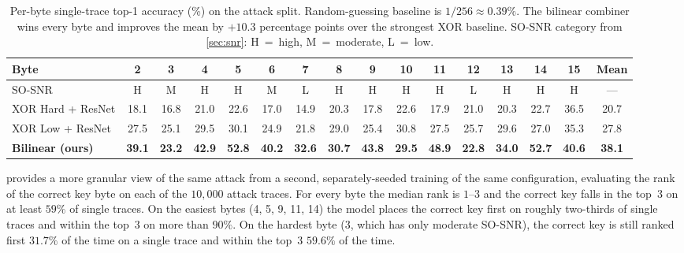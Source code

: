 \documentclass[runningheads]{llncs}
\begin{document}
\begin{table}[t]
  \centering
  \caption{Per-byte single-trace top-1 accuracy (\%) on the attack split.
  Random-guessing baseline is $1/256 \approx 0.39\%$.
  The bilinear combiner wins every byte and improves the mean by $+10.3$ percentage points over the strongest XOR baseline.
  SO-SNR category from \cref{sec:snr}: H~=~high, M~=~moderate, L~=~low.}
  \label{tab:perbyte}
  \scriptsize
  \setlength{\tabcolsep}{3pt}
  \begin{tabular}{@{}l*{14}{c}c@{}}
    \toprule
    \textbf{Byte} & 2 & 3 & 4 & 5 & 6 & 7 & 8 & 9 & 10 & 11 & 12 & 13 & 14 & 15 & \textbf{Mean} \\
    \midrule
    SO-SNR                & H & M & H & H & M & L & H & H & H & H & L & H & H & H & --- \\
    \midrule
    XOR Hard + ResNet     & 18.1 & 16.8 & 21.0 & 22.6 & 17.0 & 14.9 & 20.3 & 17.8 & 22.6 & 17.9 & 21.0 & 20.3 & 22.7 & 36.5 & 20.7 \\
    XOR Low + ResNet      & 27.5 & 25.1 & 29.5 & 30.1 & 24.9 & 21.8 & 29.0 & 25.4 & 30.8 & 27.5 & 25.7 & 29.6 & 27.0 & 35.3 & 27.8 \\
    \textbf{Bilinear (ours)} & \textbf{39.1} & \textbf{23.2} & \textbf{42.9} & \textbf{52.8} & \textbf{40.2} & \textbf{32.6} & \textbf{30.7} & \textbf{43.8} & \textbf{29.5} & \textbf{48.9} & \textbf{22.8} & \textbf{34.0} & \textbf{52.7} & \textbf{40.6} & \textbf{38.1} \\
    \bottomrule
  \end{tabular}
\end{table}

 provides a more granular view of the same attack from a second, separately-seeded training of the same configuration, evaluating the rank of the correct key byte on each of the $10{,}000$ attack traces.
For every byte the median rank is $1$--$3$ and the correct key falls in the top~$3$ on at least $59\%$ of single traces.
On the easiest bytes (4, 5, 9, 11, 14) the model places the correct key first on roughly two-thirds of single traces and within the top~$3$ on more than $90\%$.
On the hardest byte ($3$, which has only moderate SO-SNR), the correct key is still ranked first $31.7\%$ of the time on a single trace and within the top~$3$ $59.6\%$ of the time.
\end{document}

